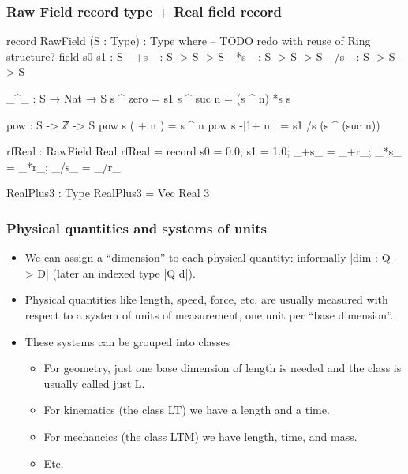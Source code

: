 \documentclass[aspectratio=169]{beamer}
\begin{document}
\begin{frame}
\subsubsection{Raw Field record type + Real field record}
\begin{code}
record RawField (S : Type) : Type where
  -- TODO redo with reuse of Ring structure?
  field
    s0 s1 : S
    _+s_ : S -> S -> S
    _*s_ : S -> S -> S
    _/s_ : S -> S -> S

  _^_ : S → Nat → S
  s ^ zero   = s1
  s ^ suc n  = (s ^ n) *s s

  pow : S -> ℤ -> S
  pow s  ( + n )  =        s ^ n
  pow s -[1+ n ]  = s1 /s (s ^ (suc n))

rfReal : RawField Real
rfReal = record {s0 = 0.0; s1 = 1.0; _+s_ = _+r_; _*s_ = _*r_; _/s_ = _/r_}

RealPlus3 : Type
RealPlus3 = Vec Real 3
\end{code}
\end{frame}
\begin{frame}
  \frametitle{Physical quantities and systems of units}
\begin{itemize}
\item We can assign a ``dimension'' to each physical quantity:
informally |dim : Q -> D| (later an indexed type |Q d|).
\item Physical quantities like length, speed, force, etc. are usually
measured with respect to a system of units of measurement, one unit
per ``base dimension''.

\pause
\item These systems can be grouped into classes
\begin{itemize}
\item For geometry, just one base dimension of length is needed and the
class is usually called just L.
\item For kinematics (the class LT) we have a length and a time.
\item For mechancics (the class LTM) we have length, time, and mass.
\item Etc.
\end{itemize}
\end{itemize}
\end{frame}
\end{document}
